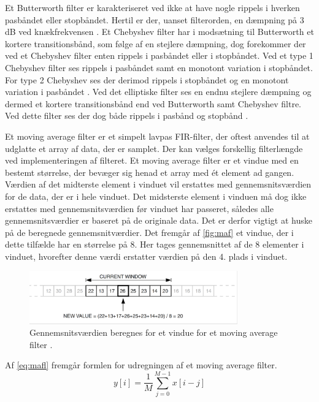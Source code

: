 \noindent
Et Butterworth filter er karakteriseret ved ikke at have nogle rippels i hverken pasbåndet eller stopbåndet. Hertil er der, uanset filterorden, en dæmpning på 3 dB ved knækfrekvensen \citep{nilsson2015}.
Et Chebyshev filter har i modsætning til Butterworth et kortere transitionsbånd, som følge af en stejlere dæmpning, dog forekommer der ved et Chebyshev filter enten rippels i pasbåndet eller i stopbåndet. Ved et type 1 Chebyshev filter ses rippels i pasbåndet samt en monotont variation i stopbåndet. For type 2 Chebyshev ses der derimod rippels i stopbåndet og en monotont variation i pasbåndet \citep{nilsson2015}. 
Ved det elliptiske filter ses en endnu stejlere dæmpning og dermed et kortere transitionsbånd end ved Butterworth samt Chebyshev filtre. Ved dette filter ses der dog både rippels i pasbånd og stopbånd \citep{nilsson2015}. 

\vspace{3mm}
\noindent
Et moving average filter er et simpelt lavpas FIR-filter, der oftest anvendes til at udglatte et array af data, der er samplet. Der kan vælges forskellig filterlængde ved implementeringen af filteret. Et moving average filter er et vindue med en bestemt størrelse, der bevæger sig henad et array med ét element ad gangen. Værdien af det midterste element i vinduet vil erstattes med gennemsnitsværdien for de data, der er i hele vinduet. Det midsterste element i vinduen må dog ikke erstattes med gennemsnitsværdien før vinduet har passeret, således alle gennemsnitsværdier er baseret på de originale data. Det er derfor vigtigt at huske på de beregnede gennemsnitværdier. Det fremgår af \autoref{fig:maf} et vindue, der i dette tilfælde har en størrelse på 8. Her tages gennemsnittet af de 8 elementer i vinduet, hvorefter denne værdi erstatter værdien på den 4. plads i vinduet.\citep{atmel2002}

\begin{figure} [H]
\centering
\includegraphics[width=0.8\textwidth]{figures/maf}
\caption{Gennemsnitsværdien beregnes for et vindue for et moving average filter \citep{atmel2002}.}
\label{fig:maf}
\end{figure} 

\noindent
Af \autoref{eq:mafl} fremgår formlen for udregningen af et moving average filter. 
\begin{equation}
	y[i]=\dfrac{1}{M}\sum^{M-1}_{j=0} x[i-j]
\label{eq:mafl}
\end{equation}

